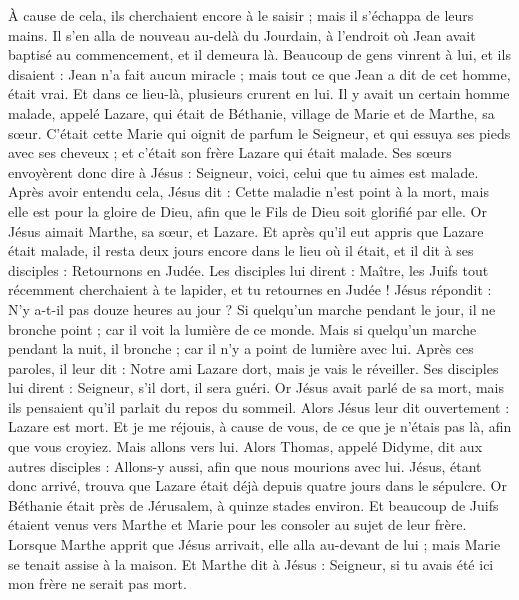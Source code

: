 \begin{multicols}{2}
À cause de cela, ils cherchaient encore à le saisir ; mais il s'échappa de leurs mains.
Il s'en alla de nouveau au-delà du Jourdain, à l'endroit où Jean avait baptisé au commencement, et il demeura là.
Beaucoup de gens vinrent à lui, et ils disaient : Jean n'a fait aucun miracle ; mais tout ce que Jean a dit de cet homme, était vrai.
Et dans ce lieu-là, plusieurs crurent en lui.
\VerseOne{}Il y avait un certain homme malade, appelé Lazare, qui était de Béthanie, village de Marie et de Marthe, sa sœur.
C'était cette Marie qui oignit de parfum le Seigneur, et qui essuya ses pieds avec ses cheveux ; et c'était son frère Lazare qui était malade.
Ses sœurs envoyèrent donc dire à Jésus : Seigneur, voici, celui que tu aimes est malade.
Après avoir entendu cela, Jésus dit : Cette maladie n'est point à la mort, mais elle est pour la gloire de Dieu, afin que le Fils de Dieu soit glorifié par elle.
Or Jésus aimait Marthe, sa sœur, et Lazare.
Et après qu'il eut appris que Lazare était malade, il resta deux jours encore dans le lieu où il était,
et il dit à ses disciples : Retournons en Judée.
Les disciples lui dirent : Maître, les Juifs tout récemment cherchaient à te lapider, et tu retournes en Judée !
Jésus répondit : N'y a-t-il pas douze heures au jour ? Si quelqu'un marche pendant le jour, il ne bronche point ; car il voit la lumière de ce monde.
Mais si quelqu'un marche pendant la nuit, il bronche ; car il n'y a point de lumière avec lui.
Après ces paroles, il leur dit : Notre ami Lazare dort, mais je vais le réveiller.
Ses disciples lui dirent : Seigneur, s'il dort, il sera guéri.
Or Jésus avait parlé de sa mort, mais ils pensaient qu'il parlait du repos du sommeil.
Alors Jésus leur dit ouvertement : Lazare est mort.
Et je me réjouis, à cause de vous, de ce que je n'étais pas là, afin que vous croyiez. Mais allons vers lui.
Alors Thomas, appelé Didyme, dit aux autres disciples : Allons-y aussi, afin que nous mourions avec lui.
Jésus, étant donc arrivé, trouva que Lazare était déjà depuis quatre jours dans le sépulcre.
Or Béthanie était près de Jérusalem, à quinze stades environ.
Et beaucoup de Juifs étaient venus vers Marthe et Marie pour les consoler au sujet de leur frère.
Lorsque Marthe apprit que Jésus arrivait, elle alla au-devant de lui ; mais Marie se tenait assise à la maison.
Et Marthe dit à Jésus : Seigneur, si tu avais été ici mon frère ne serait pas mort.

\end{multicols}
